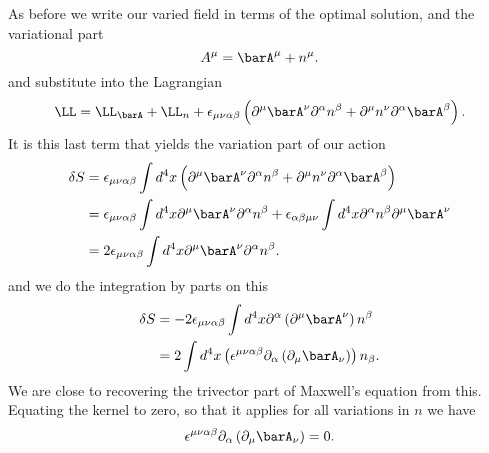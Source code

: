 As before we write our varied field in terms of the optimal solution, and the variational part
%
\begin{equation}\label{eqn:lagrangianFieldDensity:1534}
A^{\mu} = \barA^{\mu} + n^{\mu}.
\end{equation}
%
and substitute into the Lagrangian
%
\begin{equation}\label{eqn:lagrangianFieldDensity:1554}
\LL = \LL_{\barA} + \LL_{n}
+ \epsilon_{\mu\nu\alpha\beta} \left( \partial^{\mu} \barA^{\nu} \partial^{\alpha} n^{\beta} +\partial^{\mu} n^{\nu} \partial^{\alpha} \barA^{\beta} \right).
\end{equation}
%
It is this last term that yields the variation part of our action
%
\begin{equation}\label{eqn:lagrangianFieldDensity:320}
\begin{aligned}
\delta S
&= \epsilon_{\mu\nu\alpha\beta} \int d^4 x \left(\partial^{\mu} \barA^{\nu} \partial^{\alpha} n^{\beta} +\partial^{\mu} n^{\nu} \partial^{\alpha} \barA^{\beta} \right) \\
&= \epsilon_{\mu\nu\alpha\beta} \int d^4 x \partial^{\mu} \barA^{\nu} \partial^{\alpha} n^{\beta}
 + \epsilon_{\alpha\beta\mu\nu} \int d^4 x \partial^{\alpha} n^{\beta} \partial^{\mu} \barA^{\nu} \\
&= 2 \epsilon_{\mu\nu\alpha\beta} \int d^4 x \partial^{\mu} \barA^{\nu} \partial^{\alpha} n^{\beta} .
\end{aligned}
\end{equation}
%
and we do the integration by parts on this
%
\begin{equation}\label{eqn:lagrangianFieldDensity:340}
\begin{aligned}
\delta S
&= -2 \epsilon_{\mu\nu\alpha\beta} \int d^4 x \partial^{\alpha} \left(\partial^{\mu} \barA^{\nu} \right) n^{\beta} \\
&= 2 \int d^4 x \left( \epsilon^{\mu\nu\alpha\beta} \partial_{\alpha} \left(\partial_{\mu} \barA_{\nu} \right) \right) n_{\beta} .
\end{aligned}
\end{equation}
%
We are close to recovering the trivector part of Maxwell's equation from this.  Equating the kernel to zero, so that it applies for all variations in \(n\) we have
%
\begin{equation}\label{eqn:lagrangianFieldDensity:1574}
\epsilon^{\mu\nu\alpha\beta} \partial_{\alpha} \left(\partial_{\mu} \barA_{\nu} \right) = 0.
\end{equation}
